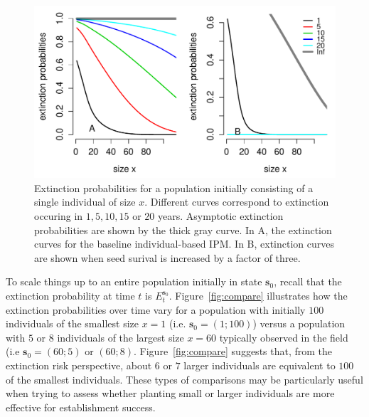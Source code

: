 \documentclass[12pt]{amsart}\usepackage[]{graphicx}\usepackage[]{color}
\makeatletter
\def\maxwidth{ %
  \ifdim\Gin@nat@width>\linewidth
    \linewidth
  \else
    \Gin@nat@width
  \fi
}
\newenvironment{knitrout}{}{} %
\def\s{\mathbf s}
\makeatother
\begin{document}
\begin{knitrout}
\color{fgcolor}\begin{figure}
\includegraphics[width=\maxwidth]{figure/extinction-1} \caption[Extinction probabilities for a population initially consisting of a single individual of size ]{Extinction probabilities for a population initially consisting of a single individual of size $x$. Different curves correspond to extinction occuring in $1,5,10,15$ or $20$ years. Asymptotic extinction probabilities are shown by the thick gray curve. In A, the extinction curves for the baseline individual-based IPM. In B, extinction curves are shown when seed surival is increased by a factor of three.}\label{fig:extinction}
\end{figure}


\end{knitrout}

To scale things up to an entire population initially in state $\s_0$, recall that the extinction probability at time $t$ is $E_t^{\s_0}$. Figure~\ref{fig:compare} illustrates how the extinction probabilities over time vary for a population with initially $100$ individuals of the smallest size $x=1$ (i.e. $\s_0=(1;100)$) versus a population with $5$ or $8$ individuals of the largest size $x=60$ typically observed in the field (i.e $\s_0=(60;5)$ or $(60;8)$. Figure~\ref{fig:compare} suggests that, from the extinction risk perspective, about $6$ or $7$ larger individuals are equivalent to $100$ of the smallest individuals. These types of comparisons may be particularly useful when trying to assess whether planting small or larger individuals are more effective for establishment success.
\end{document}
